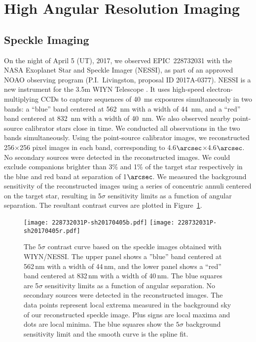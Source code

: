 \documentclass[twocolumn]{aastex61}
\begin{document}
\section{High Angular Resolution Imaging}

\subsection{Speckle Imaging}

On the night of April 5 (UT), 2017, we observed EPIC~228732031 with the NASA Exoplanet Star and Speckle Imager (NESSI), as part of an approved NOAO observing program (P.I.\ Livingston, proposal ID 2017A-0377). 
NESSI is a new instrument for the 3.5m WIYN Telescope \citep[Scott et al, in prep;][]{Scott2016}. It
uses high-speed electron-multiplying CCDs to capture sequences of 40~ms exposures
simultaneously in two bands: a ``blue'' band centered at 562~nm with a width of 44~nm, and a ``red'' band centered at 832~nm with a width of 40~nm. We also observed nearby point-source calibrator stars close in time. We conducted all observations in the two bands simultaneously. Using the point-source calibrator images, we reconstructed 256$\times$256 pixel images in each band, corresponding to 4.6$\arcsec$$\times$4.6$\arcsec$. No secondary sources were detected in the reconstructed images. We could exclude companions
brighter than 3\% and 1\% of the target star respectively in the blue and red band at separation
of 1$\arcsec$. We measured the background sensitivity of the reconstructed images using a series of concentric annuli centered on the target star, resulting in 5$\sigma$ sensitivity limits as a function of angular separation. The resultant contrast curves are plotted in Figure~\ref{speckle}.

\begin{figure}
\centering
\texttt{[image: 228732031P-sh20170405b.pdf]}
\texttt{[image: 228732031P-sh20170405r.pdf]}

\caption{The $5\sigma$ contrast curve based on the speckle images obtained with WIYN/NESSI. The upper panel shows a ''blue'' band centered at 562\,nm with a width of 44\,nm, and the lower panel shows a ``red'' band centered at 832\,nm with a width of 40\,nm. The blue squares are 5$\sigma$ sensitivity limits as a function of angular separation. No secondary sources were detected in the reconstructed images. The data points represent local extrema measured in the background sky of our reconstructed speckle image. Plus signs are local maxima and dots are local minima. The blue squares show the $5\sigma$ background sensitivity limit and the smooth curve is the spline fit.}
\label{speckle}
\end{figure}
\end{document}
